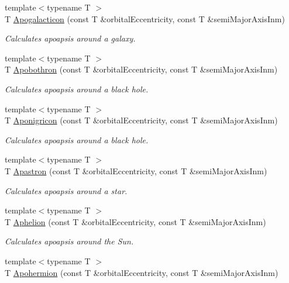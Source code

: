 \begin{DoxyCompactItemize}
{\footnotesize template$<$typename T $>$ }\\T \mbox{\hyperlink{group___e_g_x_phys-_apoapsis_gafef7ad033b39c29cdfe624cd48a6d616}{Apogalacticon}} (const T \&orbital\+Eccentricity, const T \&semi\+Major\+Axis\+Inm)
\begin{DoxyCompactList}\small\item\em Calculates apoapsis around a galaxy. \end{DoxyCompactList}\item 
{\footnotesize template$<$typename T $>$ }\\T \mbox{\hyperlink{group___e_g_x_phys-_apoapsis_ga95add3a7ff4e799bff0a508c9bdaa408}{Apobothron}} (const T \&orbital\+Eccentricity, const T \&semi\+Major\+Axis\+Inm)
\begin{DoxyCompactList}\small\item\em Calculates apoapsis around a black hole. \end{DoxyCompactList}\item 
{\footnotesize template$<$typename T $>$ }\\T \mbox{\hyperlink{group___e_g_x_phys-_apoapsis_gabceed387c4cdd53b8ccebafe2e8da8e1}{Aponigricon}} (const T \&orbital\+Eccentricity, const T \&semi\+Major\+Axis\+Inm)
\begin{DoxyCompactList}\small\item\em Calculates apoapsis around a black hole. \end{DoxyCompactList}\item 
{\footnotesize template$<$typename T $>$ }\\T \mbox{\hyperlink{group___e_g_x_phys-_apoapsis_ga809627c2522d7b4db0f27d6ea89e4f89}{Apastron}} (const T \&orbital\+Eccentricity, const T \&semi\+Major\+Axis\+Inm)
\begin{DoxyCompactList}\small\item\em Calculates apoapsis around a star. \end{DoxyCompactList}\item 
{\footnotesize template$<$typename T $>$ }\\T \mbox{\hyperlink{group___e_g_x_phys-_apoapsis_ga31b1bd55ee4ebe33f2af6827bfe30515}{Aphelion}} (const T \&orbital\+Eccentricity, const T \&semi\+Major\+Axis\+Inm)
\begin{DoxyCompactList}\small\item\em Calculates apoapsis around the Sun. \end{DoxyCompactList}\item 
{\footnotesize template$<$typename T $>$ }\\T \mbox{\hyperlink{group___e_g_x_phys-_apoapsis_ga50a476b4a3c9be6ded8308a247bf001c}{Apohermion}} (const T \&orbital\+Eccentricity, const T \&semi\+Major\+Axis\+Inm)

\end{DoxyCompactItemize}
